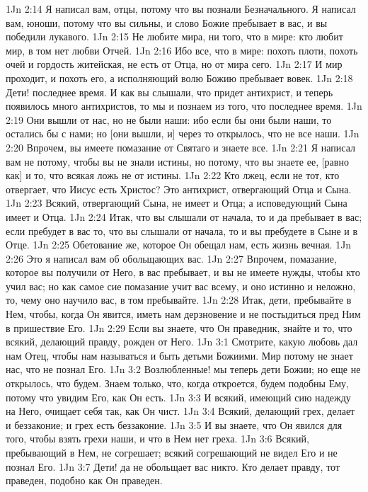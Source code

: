 1Jn 2:14  Я написал вам, отцы, потому что вы познали Безначального. Я написал вам, юноши, потому что вы сильны, и слово Божие пребывает в вас, и вы победили лукавого.
1Jn 2:15  Не любите мира, ни того, что в мире: кто любит мир, в том нет любви Отчей.
1Jn 2:16  Ибо все, что в мире: похоть плоти, похоть очей и гордость житейская, не есть от Отца, но от мира сего.
1Jn 2:17  И мир проходит, и похоть его, а исполняющий волю Божию пребывает вовек.
1Jn 2:18  Дети! последнее время. И как вы слышали, что придет антихрист, и теперь появилось много антихристов, то мы и познаем из того, что последнее время.
1Jn 2:19  Они вышли от нас, но не были наши: ибо если бы они были наши, то остались бы с нами; но [они вышли, и] через то открылось, что не все наши.
1Jn 2:20  Впрочем, вы имеете помазание от Святаго и знаете все.
1Jn 2:21  Я написал вам не потому, чтобы вы не знали истины, но потому, что вы знаете ее, [равно как] и то, что всякая ложь не от истины.
1Jn 2:22  Кто лжец, если не тот, кто отвергает, что Иисус есть Христос? Это антихрист, отвергающий Отца и Сына.
1Jn 2:23  Всякий, отвергающий Сына, не имеет и Отца; а исповедующий Сына имеет и Отца.
1Jn 2:24  Итак, что вы слышали от начала, то и да пребывает в вас; если пребудет в вас то, что вы слышали от начала, то и вы пребудете в Сыне и в Отце.
1Jn 2:25  Обетование же, которое Он обещал нам, есть жизнь вечная.
1Jn 2:26  Это я написал вам об обольщающих вас.
1Jn 2:27  Впрочем, помазание, которое вы получили от Него, в вас пребывает, и вы не имеете нужды, чтобы кто учил вас; но как самое сие помазание учит вас всему, и оно истинно и неложно, то, чему оно научило вас, в том пребывайте.
1Jn 2:28  Итак, дети, пребывайте в Нем, чтобы, когда Он явится, иметь нам дерзновение и не постыдиться пред Ним в пришествие Его.
1Jn 2:29  Если вы знаете, что Он праведник, знайте и то, что всякий, делающий правду, рожден от Него.
1Jn 3:1  Смотрите, какую любовь дал нам Отец, чтобы нам называться и быть детьми Божиими. Мир потому не знает нас, что не познал Его.
1Jn 3:2  Возлюбленные! мы теперь дети Божии; но еще не открылось, что будем. Знаем только, что, когда откроется, будем подобны Ему, потому что увидим Его, как Он есть.
1Jn 3:3  И всякий, имеющий сию надежду на Него, очищает себя так, как Он чист.
1Jn 3:4  Всякий, делающий грех, делает и беззаконие; и грех есть беззаконие.
1Jn 3:5  И вы знаете, что Он явился для того, чтобы взять грехи наши, и что в Нем нет греха.
1Jn 3:6  Всякий, пребывающий в Нем, не согрешает; всякий согрешающий не видел Его и не познал Его.
1Jn 3:7  Дети! да не обольщает вас никто. Кто делает правду, тот праведен, подобно как Он праведен.

